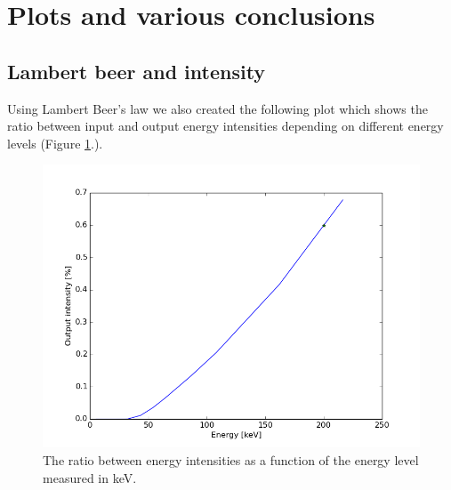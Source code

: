 \documentclass{article}
\begin{document}
\section{Plots and various conclusions}
\subsection{Lambert beer and intensity}
Using Lambert Beer's law we also created the following plot which shows the ratio between input and output energy intensities depending on different energy levels (Figure \ref{fig:energy-vs-output-percentage}.). 

\begin{figure}[H]
    \centering
    \includegraphics[scale=0.35]{images/energy-vs-output-percentage.png}
    \caption{The ratio between energy intensities as a function of the energy level measured in keV.}
    \label{fig:energy-vs-output-percentage}
\end{figure}
\end{document}
